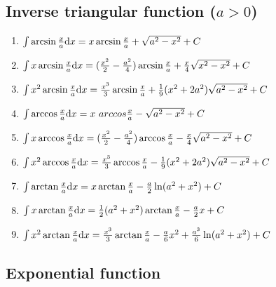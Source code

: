 	\subsection{Inverse triangular function ($a>0$)}

	\begin{enumerate}

	\item $ \int \arcsin \frac{x}{a} \mathrm{d} x = x \arcsin \frac{x}{a} + \sqrt{a^2-x^2}+C $

	\item $ \int x \arcsin \frac{x}{a} \mathrm{d} x= (\frac{x^2}{2}-\frac{a^2}{4})\arcsin \frac{x}{a} + \frac{x}{4} \sqrt{x^2-x^2}+C$

	\item $ \int x^2 \arcsin \frac{x}{a} \mathrm{d} x = \frac{x^3}{3}\arcsin \frac{x}{a}+\frac{1}{9}(x^2+2 a^2)\sqrt{a^2-x^2}+C $

	\item $ \int \arccos \frac{x}{a} \md x= x \ arccos \frac{x}{a} - \sqrt{a^2-x^2} +C $

	\item $ \int x \arccos \frac{x}{a} \mathrm{d} x= (\frac{x^2}{2}-\frac{a^2}{4})\arccos \frac{x}{a} - \frac{x}{4} \sqrt{a^2-x^2}+C $

	\item $ \int x^2 \arccos \frac{x}{a}\mathrm{d} x= \frac{x^3}{3}\arccos \frac{x}{a} - \frac{1}{9}(x^2+2a^2)\sqrt{a^2-x^2}+C$

	\item $ \int \arctan \frac{x}{a} \mathrm{d} x=x \arctan \frac{x}{a}-\frac{a}{2}\ln (a^2+x^2)+C $

	\item $ \int x\arctan \frac{x}{a} \mathrm{d} x = \frac{1}{2}(a^2+x^2)\arctan \frac{x}{a} -\frac{a}{2}x+C $

	\item $ \int x^2 \arctan \frac{x}{a} \mathrm{d} x= \frac{x^3}{3} \arctan \frac{x}{a} - \frac{a}{6}x^2 + \frac{a^3}{6} \ln (a^2+x^2)+C $

	\end {enumerate}

	\subsection{Exponential function}

